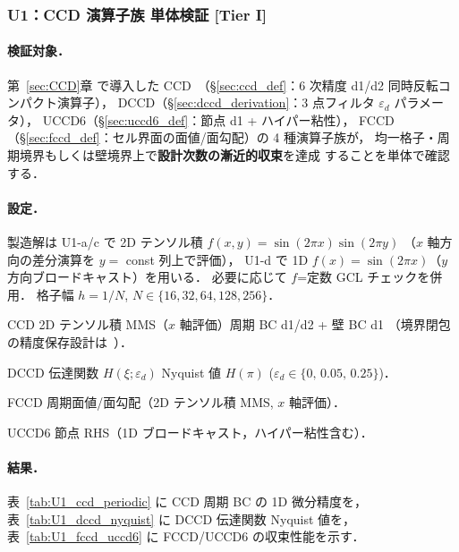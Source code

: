 %
\subsubsection{U1：CCD 演算子族 単体検証 [Tier I]}
\label{sec:U1_ccd_suite}

\paragraph{検証対象．}
第~\ref{sec:CCD}章 で導入した
CCD~\cite{ChuFan1998}（§\ref{sec:ccd_def}：6 次精度 d1/d2 同時反転コンパクト演算子），
DCCD（§\ref{sec:dccd_derivation}：3 点フィルタ $\varepsilon_d$ パラメータ），
UCCD6（§\ref{sec:uccd6_def}：節点 d1 + ハイパー粘性），
FCCD（§\ref{sec:fccd_def}：セル界面の面値/面勾配）の 4 種演算子族が，
均一格子・周期境界もしくは壁境界上で\textbf{設計次数の漸近的収束}を達成
することを単体で確認する．

\paragraph{設定．}
製造解は U1-a/c で 2D テンソル積 $f(x,y) = \sin(2\pi x)\sin(2\pi y)$
（$x$ 軸方向の差分演算を $y=$ const 列上で評価），
U1-d で 1D $f(x) = \sin(2\pi x)$（$y$ 方向ブロードキャスト）を用いる．
必要に応じて $f$=定数 GCL チェックを併用．
格子幅 $h = 1/N$, $N \in \{16, 32, 64, 128, 256\}$．
\begin{description}\setlength{\itemsep}{0pt}
  \item[U1-a] CCD 2D テンソル積 MMS（$x$ 軸評価）周期 BC d1/d2 + 壁 BC d1
        （境界閉包の精度保存設計は~\cite{Carpenter1994}）．
  \item[U1-b] DCCD 伝達関数 $H(\xi; \varepsilon_d)$ Nyquist 値 $H(\pi)$
        ($\varepsilon_d \in \{0,\, 0.05,\, 0.25\}$)．
  \item[U1-c] FCCD 周期面値/面勾配（2D テンソル積 MMS, $x$ 軸評価）．
  \item[U1-d] UCCD6 節点 RHS（1D ブロードキャスト，ハイパー粘性含む）．
\end{description}

\paragraph{結果．}
表~\ref{tab:U1_ccd_periodic} に CCD 周期 BC の 1D 微分精度を，
表~\ref{tab:U1_dccd_nyquist} に DCCD 伝達関数 Nyquist 値を，
表~\ref{tab:U1_fccd_uccd6} に FCCD/UCCD6 の収束性能を示す．

